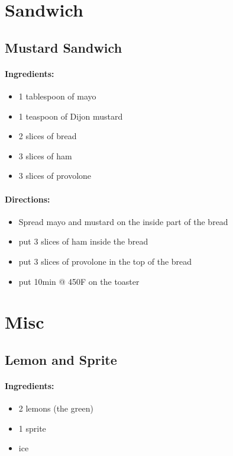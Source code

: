 \documentclass{article}
\begin{document}
\section{Sandwich}

\subsection{Mustard Sandwich}

\paragraph{Ingredients:}

\begin{itemize}
	\item 1 tablespoon of mayo 
	\item 1 teaspoon of Dijon mustard 
	\item 2 slices of bread 
	\item 3 slices of ham 
	\item 3 slices of provolone
\end{itemize}

\paragraph{Directions:}
\begin{itemize}
	\item Spread mayo and mustard on the inside part of the bread 
	\item put 3 slices of ham inside the bread 
	\item put 3 slices of provolone in the top of the bread 
	\item put 10min @ 450F on the toaster 
\end{itemize}

\section{Misc}

\subsection{Lemon and Sprite}

\paragraph{Ingredients:}

\begin{itemize}
	\item 2 lemons (the green)
	\item 1 sprite
	\item ice
\end{itemize}
\end{document}
